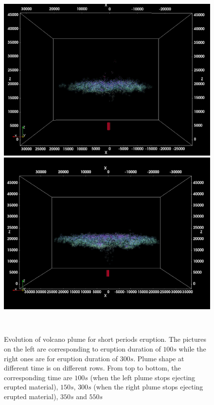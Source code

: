 \begin{figure}
\begin{minipage}{.33\textwidth}
        \includegraphics[width=0.99 \textwidth]{Chapter-6/Figures/ShortErupt/Erupt100_t550}
    \end{minipage}%
    \begin{minipage}{.33 \textwidth}
        \centering
        \includegraphics[width=0.99 \textwidth]{Chapter-6/Figures/ShortErupt/Erupt300_t550}
    \end{minipage}%
    \\
    \caption{Evolution of volcano plume for short periods eruption. The pictures on the left are corresponding to eruption duration of $100s$ while the right ones are for eruption duration of $300s$. Plume shape at different time is on different rows. From top to bottom, the corresponding time are $100s$ (when the left plume stops ejecting erupted material), $150s$, $300s$ (when the right plume stops ejecting erupted material), $350s$ and $550s$} 
    \label{fig:pinatubo-short-erupt-evolution}
\end{figure}

